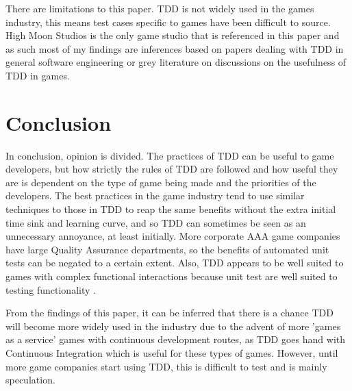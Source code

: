 \documentclass{scrartcl}
\begin{document}
There are limitations to this paper. TDD is not widely used in the games industry, this means test cases specific to games have been difficult to source. High Moon Studios is the only game studio that is referenced in this paper and as such most of my findings are inferences based on papers dealing with TDD in general software engineering or grey literature on discussions on the usefulness of TDD in games. 

\section*{Conclusion}

In conclusion, opinion is divided. The practices of TDD can be useful to game developers, but how strictly the rules of TDD are followed \cite{UncleBob} and how useful they are is dependent on the type of game being made and the priorities of the developers. The best practices in the game industry tend to use similar techniques to those in TDD to reap the same benefits \cite{fucci2017dissection} without the extra initial time sink and learning curve, and so TDD can sometimes be seen as an unnecessary annoyance, at least initially. More corporate AAA game companies have large Quality Assurance departments, so the benefits of automated unit tests can be negated to a certain extent. Also, TDD appears to be well suited to games with complex functional interactions because unit test are well suited to testing functionality \cite{GDCConcurrent}. 

From the findings of this paper, it can be inferred that there is a chance TDD will become more widely used in the industry due to the advent of more 'games as a service' games with continuous development routes, as TDD goes hand with Continuous Integration which is useful for these types of games. However, until more game companies start using TDD, this is difficult to test and is mainly speculation.






\end{document}
